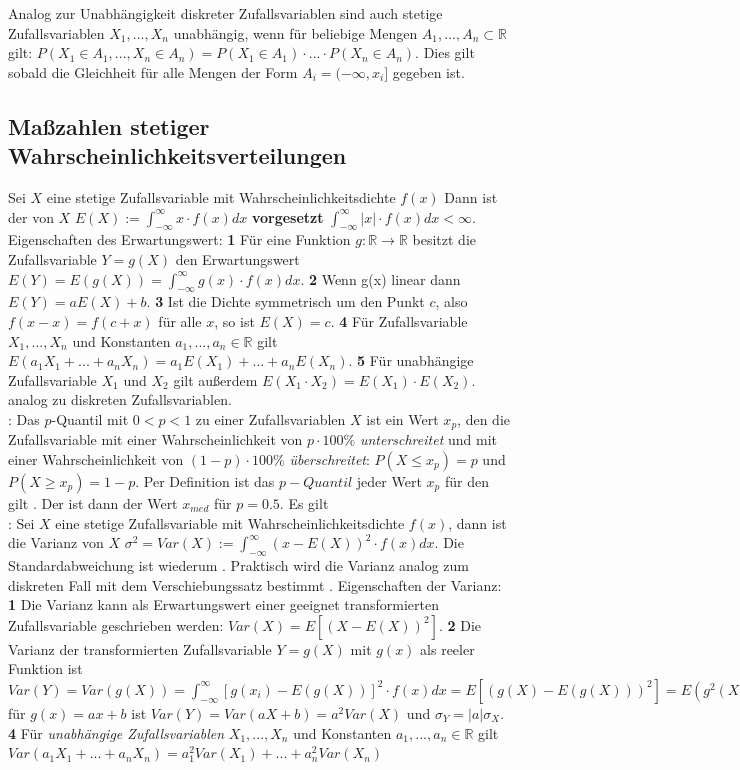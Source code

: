  Analog zur Unabhängigkeit diskreter Zufallsvariablen sind auch stetige Zufallsvariablen $X_1, ..., X_n$ unabhängig, wenn für beliebige Mengen $A_1, ..., A_n \subset \mathds{R}$ gilt: $P(X_1 \in A_1, ..., X_n \in A_n) = P(X_1 \in A_1) \cdot ... \cdot P(X_n \in A_n)$. Dies gilt sobald die Gleichheit für alle Mengen der Form $A_i = (-\infty, x_i]$ gegeben ist.
\subsection{Maßzahlen stetiger Wahrscheinlichkeitsverteilungen}

Sei $X$ eine stetige Zufallsvariable mit Wahrscheinlichkeitsdichte $f(x)$ Dann ist der  von $X$ $E(X):=\int_{-\infty}^\infty x\cdot f(x)dx$ \textbf{vorgesetzt} $\int_{-\infty}^\infty |x|\cdot f(x)dx < \infty$. Eigenschaften des Erwartungswert: \textbf{1} Für eine Funktion $g: \mathds{R} \rightarrow \mathds{R}$ besitzt die Zufallsvariable $Y = g(X)$ den Erwartungswert $E(Y) = E(g(X)) = \int_{-\infty}^{\infty}g(x) \cdot f(x) dx$. \textbf{2} Wenn g(x) linear dann $E(Y) = aE(X) + b$. \textbf{3} Ist die Dichte symmetrisch um den Punkt $c$, also $f(x - x) = f(c + x)$ für alle $x$, so ist $E(X) = c$. \textbf{4} Für Zufallsvariable $X_1, ..., X_n$ und Konstanten $a_1, ..., a_n \in \mathds{R}$ gilt $E(a_1X_1 + ... + a_nX_n) = a_1E(X_1) + ... + a_nE(X_n)$. \textbf{5} Für unabhängige Zufallsvariable $X_1$ und $X_2$ gilt außerdem $E(X_1 \cdot X_2) = E(X_1) \cdot E(X_2)$.  analog zu diskreten Zufallsvariablen.\\
: Das $p$-Quantil mit $0<p<1$ zu einer Zufallsvariablen $X$ ist ein Wert $x_p$, den die Zufallsvariable mit einer Wahrscheinlichkeit von $p \cdot 100\%$ \emph{unterschreitet} und mit einer Wahrscheinlichkeit von $(1 - p) \cdot 100\%$ \emph{überschreitet}: $P(X \le x_p) = p$ und $P(X \ge x_p) = 1 - p$. Per Definition ist das $p-Quantil$ jeder Wert $x_p$ für den gilt . Der  ist dann der Wert $x_{med}$ für $p = 0.5$. Es gilt \\
: Sei $X$ eine stetige Zufallsvariable mit Wahrscheinlichkeitsdichte $f(x)$, dann ist die Varianz von $X$ $\sigma^2 = Var(X):= \int_{-\infty}^{\infty}(x - E(X))^2 \cdot f(x) dx$. Die Standardabweichung ist wiederum . Praktisch wird die Varianz analog zum diskreten Fall mit dem Verschiebungssatz bestimmt . Eigenschaften der Varianz: \textbf{1} Die Varianz kann als Erwartungswert einer geeignet transformierten Zufallsvariable geschrieben werden: $Var(X) = E[(X - E(X))^2]$. \textbf{2} Die Varianz der transformierten Zufallsvariable $Y = g(X)$ mit $g(x)$ als reeler Funktion ist $Var(Y) = Var(g(X)) = \int_{-\infty}^{\infty}[g(x_i) - E(g(X))]^2 \cdot f(x) dx = E[(g(X) - E(g(X)))^2] = E(g^2(X)) - E^2(g(X))$ für $g(x) = ax + b$ ist $Var(Y) = Var(aX + b) = a^2Var(X)$ und $\sigma_Y = |a|\sigma_X$. \textbf{4} Für \emph{unabhängige Zufallsvariablen} $X_1, ..., X_n$ und Konstanten $a_1, ..., a_n \in \mathds{R}$ gilt $Var(a_1X_1 + ... + a_nX_n) = a_1^2Var(X_1) + ... + a_n^2Var(X_n)$\\\\
